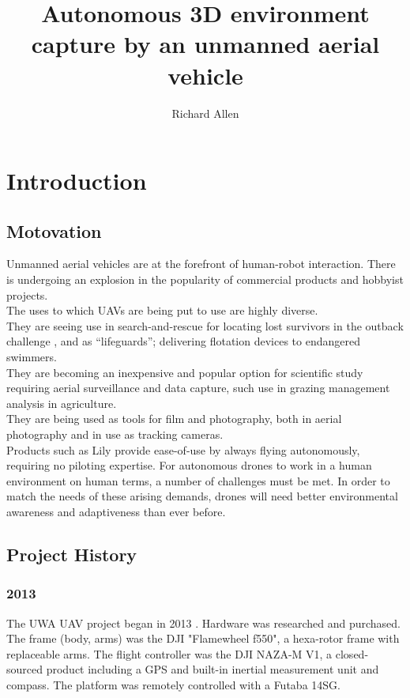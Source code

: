 \documentclass{article}
\title{Autonomous 3D environment capture by an unmanned aerial vehicle}
\author{Richard Allen}
\begin{document}
\maketitle

\section{Introduction}
	\subsection{Motovation}
Unmanned aerial vehicles are at the forefront of human-robot interaction. There is undergoing an explosion in the popularity of commercial products and hobbyist projects.
\\The uses to which UAVs are being put to use are highly diverse. 
\\They are seeing use in search-and-rescue for locating lost survivors in the outback challenge \cite{canberrauav-2012}, and as ``lifeguards''; delivering flotation devices to endangered swimmers\cite{Motherboard}.
\\They are becoming an inexpensive and popular option for scientific study requiring aerial surveillance and data capture, such use in grazing management analysis in agriculture\cite{UWAnews}.
\\They are being used as tools for film and photography, both in aerial photography and in use as tracking cameras. 
\\Products such as Lily \cite{Lily} provide ease-of-use by always flying autonomously, requiring no piloting expertise. For autonomous drones to work in a human environment on human terms, a number of challenges must be met. In order to match the needs of these arising demands, drones will need better environmental awareness and adaptiveness than ever before.


	\subsection{Project History}
		\subsubsection{2013}
The UWA UAV project began in 2013 \cite{Venables}\cite{OConnor}. Hardware was researched and purchased. The frame (body, arms) was the DJI "Flamewheel f550", a hexa-rotor frame with replaceable arms. The flight controller was the DJI NAZA-M V1, a closed-sourced product including a GPS and built-in inertial measurement unit and compass. The platform was remotely controlled with a Futaba 14SG.
\end{document}
